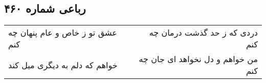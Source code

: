 \begin{center}
\section*{رباعی شماره ۴۶۰}
\label{sec:sh460}
\begin{longtable}{l p{0.5cm} r}
عشق تو ز خاص و عام پنهان چه کنم
&&
دردی که ز حد گذشت درمان چه کنم
\\
خواهم که دلم به دیگری میل کند
&&
من خواهم و دل نخواهد ای جان چه کنم
\\
\end{longtable}
\end{center}
